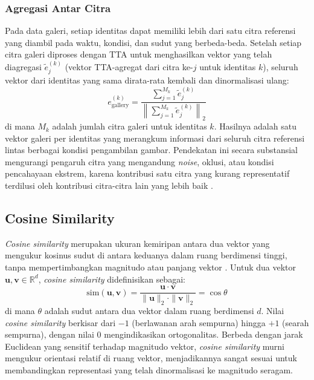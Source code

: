\subsubsection{Agregasi Antar Citra}
 
Pada data galeri, setiap identitas dapat memiliki lebih dari satu citra referensi yang diambil pada waktu, kondisi, dan sudut yang berbeda-beda. Setelah setiap citra galeri diproses dengan TTA untuk menghasilkan vektor yang telah diagregasi $\tilde{e}_j^{(k)}$ (vektor TTA-agregat dari citra ke-$j$ untuk identitas $k$), seluruh vektor dari identitas yang sama dirata-rata kembali dan dinormalisasi ulang:
\begin{equation}
    e_{\text{gallery}}^{(k)}
    = \frac{\displaystyle\sum_{j=1}^{M_k} \tilde{e}_j^{(k)}}
           {\left\|\displaystyle\sum_{j=1}^{M_k} \tilde{e}_j^{(k)}\right\|_2}
\end{equation}
di mana $M_k$ adalah jumlah citra galeri untuk identitas $k$. Hasilnya adalah satu vektor galeri per identitas yang merangkum informasi dari seluruh citra referensi lintas berbagai kondisi pengambilan gambar. Pendekatan ini secara substansial mengurangi pengaruh citra yang mengandung \textit{noise}, oklusi, atau kondisi pencahayaan ekstrem, karena kontribusi satu citra yang kurang representatif terdilusi oleh kontribusi citra-citra lain yang lebih baik \cite{zhong2017reranking}.

\subsection{Cosine Similarity}
\textit{Cosine similarity} merupakan ukuran kemiripan antara dua vektor yang mengukur kosinus sudut di antara keduanya dalam ruang berdimensi tinggi, tanpa mempertimbangkan magnitudo atau panjang vektor \cite{manning2008introduction}. Untuk dua vektor $\mathbf{u}, \mathbf{v} \in \mathbb{R}^d$, \textit{cosine similarity} didefinisikan sebagai:
\begin{equation}
    \text{sim}(\mathbf{u}, \mathbf{v})
    = \frac{\mathbf{u} \cdot \mathbf{v}}{\|\mathbf{u}\|_2 \cdot \|\mathbf{v}\|_2}
    = \cos\theta
\end{equation}
di mana $\theta$ adalah sudut antara dua vektor dalam ruang berdimensi $d$. Nilai \textit{cosine similarity} berkisar dari $-1$ (berlawanan arah sempurna) hingga $+1$ (searah sempurna), dengan nilai 0 mengindikasikan ortogonalitas. Berbeda dengan jarak Euclidean yang sensitif terhadap magnitudo vektor, \textit{cosine similarity} murni mengukur orientasi relatif di ruang vektor, menjadikannya sangat sesuai untuk membandingkan representasi yang telah dinormalisasi ke magnitudo seragam.
 
